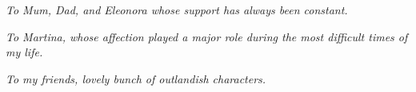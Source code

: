 \newpage \vspace*{8cm}
\thispagestyle{empty}

\begin{flushright}
   \emph{To Mum, Dad, and Eleonora whose support has always been constant.}
\end{flushright}

\begin{flushright}
   \emph{To Martina, whose affection played a major role during the most difficult times of my life.}
\end{flushright}

\begin{flushright}
   \emph{To my friends, lovely bunch of outlandish characters.}
\end{flushright}